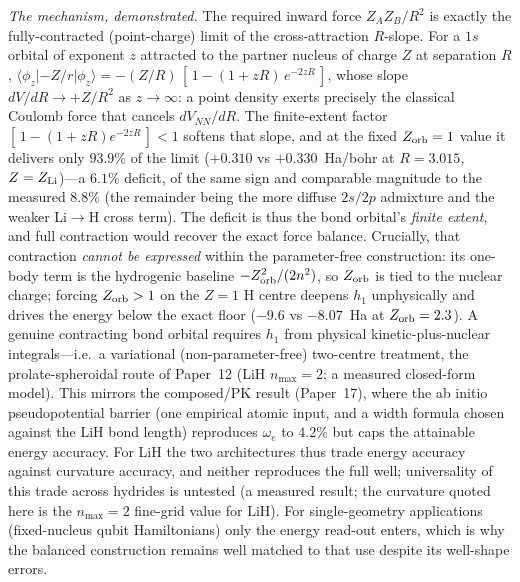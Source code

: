 \documentclass[aps,pra,twocolumn,superscriptaddress,longbibliography]{revtex4-2}
\begin{document}
\emph{The mechanism, demonstrated.}  The required inward force $Z_A Z_B/R^2$ is
exactly the fully-contracted (point-charge) limit of the cross-attraction
$R$-slope.  For a $1s$ orbital of exponent $z$ attracted to the partner nucleus
of charge $Z$ at separation $R$,
$\langle\phi_z|{-}Z/r|\phi_z\rangle = -(Z/R)\,[\,1-(1+zR)\,e^{-2zR}\,]$, whose
slope $dV/dR \to +Z/R^2$ as $z\to\infty$: a point density exerts precisely the
classical Coulomb force that cancels $dV_{NN}/dR$.  The finite-extent factor
$[\,1-(1+zR)e^{-2zR}\,] < 1$ softens that slope, and at the fixed
$Z_{\rm orb}=1$ value it delivers only $93.9\%$ of the limit ($+0.310$ vs
$+0.330$~Ha/bohr at $R=3.015$, $Z=Z_{\rm Li}$)---a $6.1\%$ deficit, of the same
sign and comparable magnitude to the measured $8.8\%$ (the remainder being the
more diffuse $2s/2p$ admixture and the weaker Li$\to$H cross term).  The deficit
is thus the bond orbital's \emph{finite extent}, and full contraction would
recover the exact force balance.  Crucially, that contraction \emph{cannot be
expressed} within the parameter-free construction: its one-body term is the
hydrogenic baseline $-Z_{\rm orb}^2/(2n^2)$, so $Z_{\rm orb}$ is tied to the
nuclear charge; forcing $Z_{\rm orb}>1$ on the $Z=1$ H centre deepens $h_1$
unphysically and drives the energy below the exact floor ($-9.6$ vs $-8.07$~Ha at
$Z_{\rm orb}=2.3$).  A genuine contracting bond orbital requires $h_1$ from
physical kinetic-plus-nuclear integrals---i.e.\ a variational
(non-parameter-free) two-centre treatment, the prolate-spheroidal route of
Paper~12 (LiH $n_{\max}=2$; a measured closed-form model).  This
mirrors the composed/PK result (Paper~17), where the ab initio
pseudopotential barrier (one empirical atomic input, and a width formula
chosen against the LiH bond length) reproduces $\omega_e$ to $4.2\%$ but caps the attainable
energy accuracy.  For LiH the two architectures thus trade energy accuracy
against curvature accuracy, and neither reproduces the full well; universality
of this trade across hydrides is untested (a measured result; the curvature
quoted here is the $n_{\max}=2$ fine-grid value for LiH).  For single-geometry applications
(fixed-nucleus qubit Hamiltonians) only the energy read-out enters, which is why
the balanced construction remains well matched to that use despite its
well-shape errors.
\end{document}
